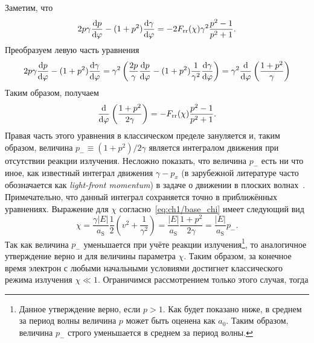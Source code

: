 Заметим, что 
\begin{align}
    \label{eq:ch1/sec6/integral}
    2p\gamma \dv{p}{\varphi} - (1 + p^2)\dv{\gamma}{\varphi}  = - 2 F_\mathrm{rr}(\chi) \gamma^2 \frac{p^2 - 1}{p^2 + 1}.
\end{align}
Преобразуем левую часть уравнения
\begin{align}
    2p\gamma \dv{p}{\varphi} - (1 + p^2)\dv{\gamma}{\varphi} = \gamma^2 \left( \frac{2p}{\gamma} \dv{p}{\varphi} - (1 + p^2)\frac{1}{\gamma^2}\dv{\gamma}{\varphi} \right) = \gamma^2 \dv{}{\varphi} \left( \frac{1+p^2}{\gamma} \right)
\end{align}
Таким образом, получаем
\begin{equation}
    \dv{}{\varphi} \left( \frac{1+p^2}{2\gamma} \right) = -  F_\mathrm{rr}(\chi) \frac{p^2 - 1}{p^2 + 1}.
\end{equation}
Правая часть этого уравнения в классическом пределе зануляется и, таким образом, величина $p_-\equiv(1 + p^2) / 2\gamma$ является интегралом движения при отсутствии реакции излучения.
Несложно показать, что величина $p_-$ есть ни что иное, как известный интеграл движения $\gamma - p_x$ (в зарубежной литературе часто обозначается как \textit{light-front momentum}) в задаче о движении в плоских волнах~\cite{LandauII}.
Примечательно, что данный интеграл сохраняется точно в приближённых уравнениях.
Выражение для $\chi$ согласно~\eqref{eq:ch1/base_chi} имеет следующий вид
\begin{equation}
    \label{eq:ch1/sec5/chi_pw}
    \chi = \frac{\gamma |E|}{a_\mathrm{S}} \frac{1}{2} \left( v^2 + \frac{1}{\gamma^2} \right) = \frac{|E|}{a_\mathrm{S}} \frac{1 + p^2}{2\gamma} = \frac{|E|}{a_\mathrm{S}} p_-.
\end{equation}
Так как величина $p_-$ уменьшается при учёте реакции излучения\footnote{Данное утверждение верно, если $p > 1$. Как будет показано ниже, в среднем за период волны величина $p$ может  быть оценена как $a_0$. Таким образом, величина $p_-$ строго уменьшается в среднем за период волны.}, то аналогичное утверждение верно и для величины параметра $\chi$.
Таким образом, за конечное время электрон с любыми начальными условиями достигнет классического режима излучения $\chi \ll 1$.
Ограничимся рассмотрением только этого случая, тогда
